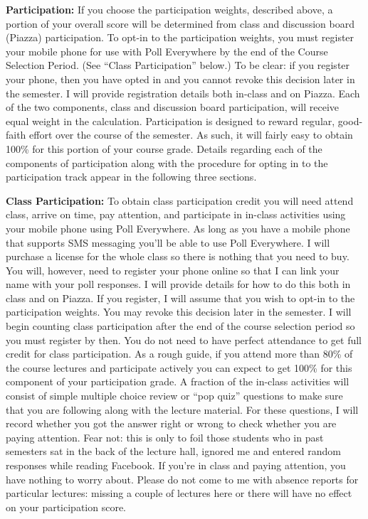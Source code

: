\documentclass[11pt, letterpaper]{article}
\begin{document}
\medskip

\noindent \textbf{Participation:} If you choose the participation weights, described above, a portion of your overall score will be determined from class and discussion board (Piazza) participation. 
To opt-in to the participation weights, you must register your mobile phone for use with Poll Everywhere by the end of the Course Selection Period.
(See ``Class Participation'' below.)
To be clear: if you register your phone, then you have opted in and you cannot revoke this decision later in the semester.
I will provide registration details both in-class and on Piazza.
Each of the two components, class and discussion board participation, will receive equal weight in the calculation.
Participation is designed to reward regular, good-faith effort over the course of the semester.
As such, it will fairly easy to obtain 100\% for this portion of your course grade.
Details regarding each of the components of participation along with the procedure for opting in to the participation track appear in the following three sections.

\medskip 

\noindent \textbf{Class Participation:}
To obtain class participation credit you will need attend class, arrive on time, pay attention, and participate in in-class activities using your mobile phone using Poll Everywhere.
As long as you have a mobile phone that supports SMS messaging you'll be able to use Poll Everywhere. 
I will purchase a license for the whole class so there is nothing that you need to buy.
You will, however, need to register your phone online so that I can link your name with your poll responses.
I will provide details for how to do this both in class and on Piazza.
If you register, I will assume that you wish to opt-in to the participation weights. 
You may revoke this decision later in the semester.
I will begin counting class participation after the end of the course selection period so you must register by then.
You do not need to have perfect attendance to get full credit for class participation.
As a rough guide, if you attend more than 80\% of the course lectures and participate actively you can expect to get 100\% for this component of your participation grade.
A fraction of the in-class activities will consist of simple multiple choice review or ``pop quiz'' questions to make sure that you are following along with the lecture material.
For these questions, I will record whether you got the answer right or wrong to check whether you are paying attention.
Fear not: this is only to foil those students who in past semesters sat in the back of the lecture hall, ignored me and entered random responses while reading Facebook.
If you're in class and paying attention, you have nothing to worry about.
Please do not come to me with absence reports for particular lectures: missing a couple of lectures here or there will have no effect on your participation score.
\end{document}
